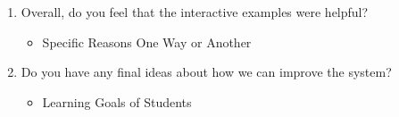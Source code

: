 \begin{enumerate}
	\item Overall, do you feel that the interactive examples were helpful?
	\begin{itemize}
		\item Specific Reasons One Way or Another
	\end{itemize}
	\item Do you have any final ideas about how we can improve the system?
	\begin{itemize}
		\item Learning Goals of Students
	\end{itemize}
\end{enumerate}